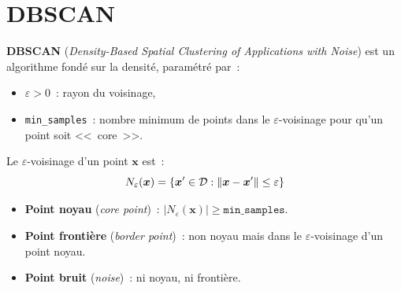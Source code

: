 \begin{center}
\end{center}

\section{DBSCAN}
\label{sec:dbscan}

\begin{definition}[DBSCAN]
\textbf{DBSCAN} (\emph{Density-Based Spatial Clustering of Applications with
Noise}) est un algorithme fond\'e sur la densit\'e, param\'etr\'e par~:
\begin{itemize}
  \item $\varepsilon > 0$~: rayon du voisinage,
  \item \texttt{min\_samples}~: nombre minimum de points dans le
    $\varepsilon$-voisinage pour qu'un point soit <<~core~>>.
\end{itemize}
\end{definition}

\begin{definition}
Le $\varepsilon$-voisinage d'un point $\bm{x}$ est~:
\begin{equation}
  N_\varepsilon(\bm{x}) = \{\bm{x}' \in \mathcal{D} : \left\| \bm{x} - \bm{x}' \right\|
  \leq \varepsilon\}
\end{equation}
\end{definition}

\begin{definition}
\begin{itemize}
  \item \textbf{Point noyau} (\emph{core point})~:
    $|N_\varepsilon(\bm{x})| \geq \texttt{min\_samples}$.
  \item \textbf{Point fronti\`ere} (\emph{border point})~: non noyau mais dans
    le $\varepsilon$-voisinage d'un point noyau.
  \item \textbf{Point bruit} (\emph{noise})~: ni noyau, ni fronti\`ere.
\end{itemize}
\end{definition}

